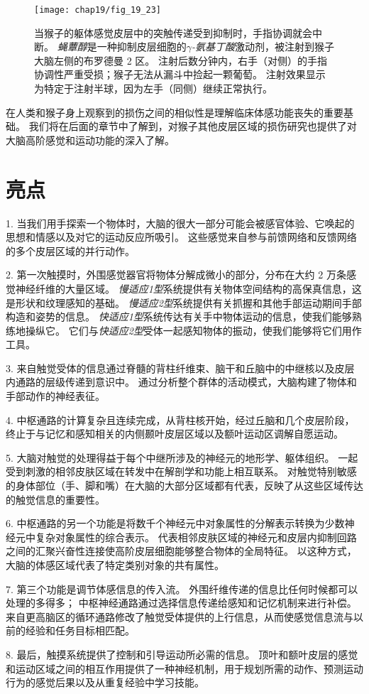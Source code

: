 \begin{figure}[htbp]
	\centering
	\texttt{[image: chap19/fig\_19\_23]}
	\caption{当猴子的躯体感觉皮层中的突触传递受到抑制时，手指协调就会中断。
		\textit{蝇蕈醇}是一种抑制皮层细胞的\textit{$\gamma$-氨基丁酸}激动剂，被注射到猴子大脑左侧的布罗德曼 2 区。
		注射后数分钟内，右手（对侧）的手指协调性严重受损；猴子无法从漏斗中捡起一颗葡萄。
		注射效果显示为特定于注射半球，因为左手（同侧）继续正常执行\cite{hikosaka1985deficits}。}
	\label{fig:19_23}
\end{figure}


在人类和猴子身上观察到的损伤之间的相似性是理解临床体感功能丧失的重要基础。 
我们将在后面的章节中了解到，对猴子其他皮层区域的损伤研究也提供了对大脑高阶感觉和运动功能的深入了解。


\section{亮点}

1. 当我们用手探索一个物体时，大脑的很大一部分可能会被感官体验、它唤起的思想和情感以及对它的运动反应所吸引。
这些感觉来自参与前馈网络和反馈网络的多个皮层区域的并行动作。


2. 第一次触摸时，外围感觉器官将物体分解成微小的部分，分布在大约 2 万条感觉神经纤维的大量区域。 
\textit{慢适应1型}系统提供有关物体空间结构的高保真信息，这是形状和纹理感知的基础。
\textit{慢适应2型}系统提供有关抓握和其他手部运动期间手部构造和姿势的信息。
\textit{快适应1型}系统传达有关手中物体运动的信息，使我们能够熟练地操纵它。
它们与\textit{快适应2型}受体一起感知物体的振动，使我们能够将它们用作工具。 


3. 来自触觉受体的信息通过脊髓的背柱纤维束、脑干和丘脑中的中继核以及皮层内通路的层级传递到意识中。 
通过分析整个群体的活动模式，大脑构建了物体和手部动作的神经表征。


4. 中枢通路的计算复杂且连续完成，从背柱核开始，经过丘脑和几个皮层阶段，终止于与记忆和感知相关的内侧颞叶皮层区域以及额叶运动区调解自愿运动。


5. 大脑对触觉的处理得益于每个中继所涉及的神经元的地形学、躯体组织。
一起受到刺激的相邻皮肤区域在转发中在解剖学和功能上相互联系。
对触觉特别敏感的身体部位（手、脚和嘴）在大脑的大部分区域都有代表，反映了从这些区域传达的触觉信息的重要性。 


6. 中枢通路的另一个功能是将数千个神经元中对象属性的分解表示转换为少数神经元中复杂对象属性的综合表示。
代表相邻皮肤区域的神经元和皮层内抑制回路之间的汇聚兴奋性连接使高阶皮层细胞能够整合物体的全局特征。
以这种方式，大脑的体感区域代表了特定类别对象的共有属性。


7. 第三个功能是调节体感信息的传入流。
外围纤维传递的信息比任何时候都可以处理的多得多； 中枢神经通路通过选择信息传递给感知和记忆机制来进行补偿。
来自更高脑区的循环通路修改了触觉受体提供的上行信息，从而使感觉信息流与以前的经验和任务目标相匹配。 


8. 最后，触摸系统提供了控制和引导运动所必需的信息。
顶叶和额叶皮层的感觉和运动区域之间的相互作用提供了一种神经机制，用于规划所需的动作、预测运动行为的感觉后果以及从重复经验中学习技能。


